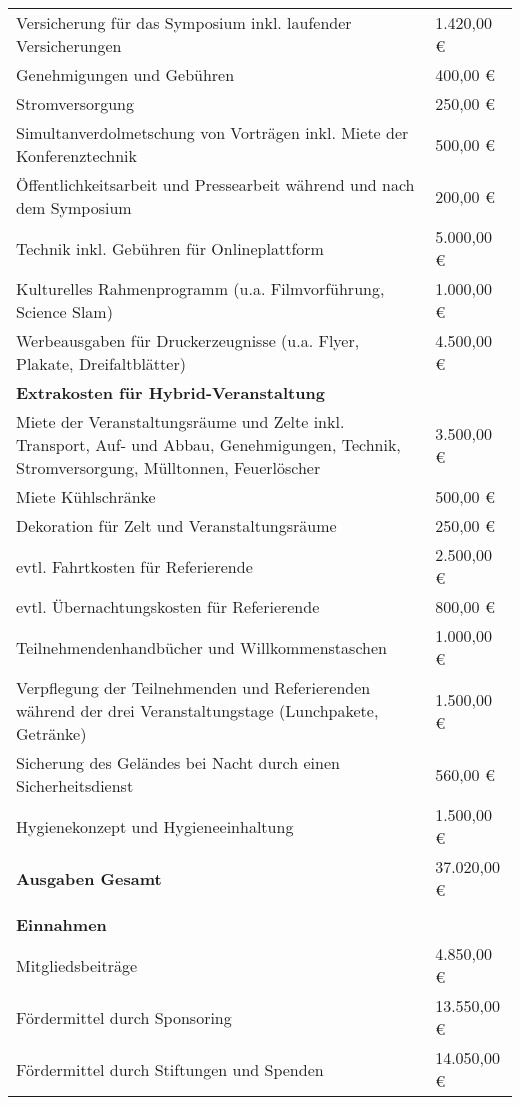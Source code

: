 {\begin{longtable}{p{12cm} p{3cm}}
        Versicherung für das Symposium inkl. laufender Versicherungen & 1.420,00 €\\
        Genehmigungen und Gebühren & 400,00 € \\
        Stromversorgung & 250,00 € \\
        Simultanverdolmetschung von Vorträgen inkl. Miete der Konferenztechnik & 500,00 €\\
        Öffentlichkeitsarbeit und Pressearbeit während und nach dem Symposium & 200,00 €\\
        Technik inkl. Gebühren für Onlineplattform & 5.000,00 €\\
        Kulturelles Rahmenprogramm (u.a. Filmvorführung, Science Slam) & 1.000,00 €\\
        Werbeausgaben für Druckerzeugnisse (u.a. Flyer, Plakate, Dreifaltblätter) & 4.500,00 €\\
        \textbf{Extrakosten für Hybrid-Veranstaltung}&\\
        Miete der Veranstaltungsräume und Zelte inkl. Transport, Auf- und Abbau, Genehmigungen, Technik, Stromversorgung, Mülltonnen, Feuerlöscher & 3.500,00 €\\
        Miete Kühlschränke & 500,00 €\\
        Dekoration für Zelt und Veranstaltungsräume & 250,00 €\\
        evtl. Fahrtkosten für Referierende & 2.500,00 €\\
        evtl. Übernachtungskosten für Referierende & 800,00 €\\
        Teilnehmendenhandbücher und Willkommenstaschen & 1.000,00 €\\
        Verpflegung der Teilnehmenden und Referierenden während der drei Veranstaltungstage (Lunchpakete, Getränke) & 1.500,00 €\\
        Sicherung des Geländes bei Nacht durch einen Sicherheitsdienst & 560,00 €\\
        Hygienekonzept und Hygieneeinhaltung & 1.500,00 €\\
        \textbf{Ausgaben Gesamt} & 37.020,00 €\\
        \\
        \textbf{Einnahmen}&\\
        Mitgliedsbeiträge & 4.850,00 €\\
        Fördermittel durch Sponsoring & 13.550,00 €\\
        Fördermittel durch Stiftungen und Spenden & 14.050,00 €\\

\end{longtable}}
